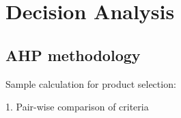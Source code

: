 \section{Decision Analysis}
\label{app:matrix}

\subsection{AHP methodology}
Sample calculation for product selection:

1. Pair-wise comparison of criteria
